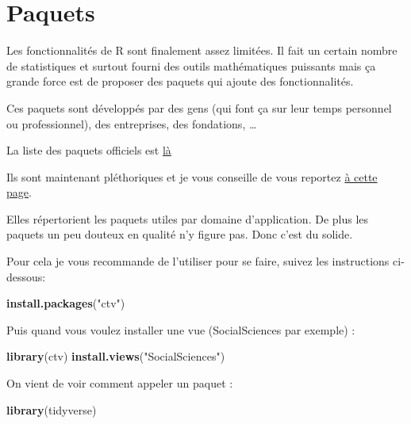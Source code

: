 \documentclass[
]{book}
\newenvironment{Shaded}{\begin{snugshade}}{\end{snugshade}}
\newcommand{\FunctionTok}[1]{\textcolor[rgb]{0.13,0.29,0.53}{\textbf{#1}}}
\newcommand{\NormalTok}[1]{#1}
\newcommand{\StringTok}[1]{\textcolor[rgb]{0.31,0.60,0.02}{#1}}
\begin{document}
\hypertarget{paquets}{%
\section{Paquets}\label{paquets}}

Les fonctionnalités de R sont finalement assez limitées. Il fait un certain
nombre de statistiques et surtout fourni des outils mathématiques puissants
mais ça grande force est de proposer des paquets qui ajoute des fonctionnalités.

Ces paquets sont développés par des gens (qui font ça sur leur temps personnel
ou professionnel), des entreprises, des fondations, \ldots{}

La liste des paquets officiels est \href{https://cran.r-project.org/web/packages/available_packages_by_name.html}{là}

Ils sont maintenant pléthoriques et je vous conseille de vous reportez \href{https://cran.r-project.org/web/views/}{à cette page}.

Elles répertorient les paquets utiles par domaine d'application. De plus les
paquets un peu douteux en qualité n'y figure pas. Donc c'est du solide.

Pour cela je vous recommande de l'utiliser pour se faire, suivez les instructions ci-dessous:

\begin{Shaded}
\begin{Highlighting}[]
\FunctionTok{install.packages}\NormalTok{(}\StringTok{"ctv"}\NormalTok{)}
\end{Highlighting}
\end{Shaded}

Puis quand vous voulez installer une vue (SocialSciences par exemple) :

\begin{Shaded}
\begin{Highlighting}[]
\FunctionTok{library}\NormalTok{(ctv)}
\FunctionTok{install.views}\NormalTok{(}\StringTok{"SocialSciences"}\NormalTok{)}
\end{Highlighting}
\end{Shaded}

On vient de voir comment appeler un paquet :

\begin{Shaded}
\begin{Highlighting}[]
\FunctionTok{library}\NormalTok{(tidyverse)}
\end{Highlighting}
\end{Shaded}
\end{document}
